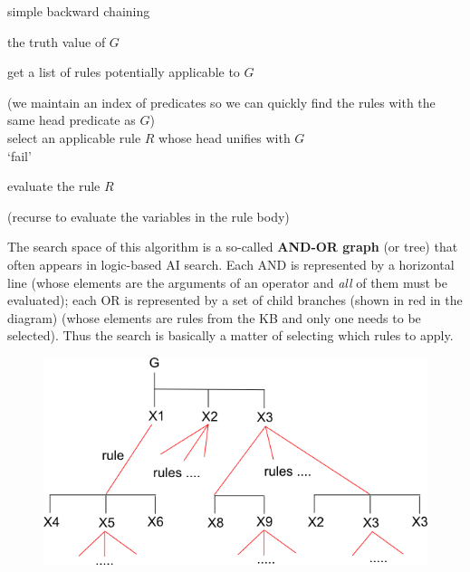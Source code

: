 \begin{algorithm}[H]
\caption{simple backward chaining}
{the truth value of $G$}
\begin{algtab}

\algrepeatforever
get a list of rules potentially applicable to $G$\\

\addtocounter{algline}{-1}\algnonumber (we maintain an index of predicates so we can quickly find the rules with the same head predicate as $G$)\\

select an applicable rule $R$ whose head unifies with $G$\\

\algreturn `fail'\\
\algend

evaluate the rule $R$\\
\addtocounter{algline}{-1}\algnonumber (recurse to evaluate the variables in the rule body)\\

\end{algtab}
\end{algorithm}
\vspace{-0.6cm}

The search space of this algorithm is a so-called \textbf{AND-OR graph} (or tree) that often appears in logic-based AI search.  Each AND is represented by a horizontal line (whose elements are the arguments of an operator and \textit{all} of them must be evaluated);  each OR is represented by a set of child branches (shown in red in the diagram) (whose elements are rules from the KB and only one needs to be selected).  Thus the search is basically a matter of selecting which rules to apply.
\begin{figure}[H]
\centering
\includegraphics[scale=0.8]{and-or-graph.png}
\end{figure}

